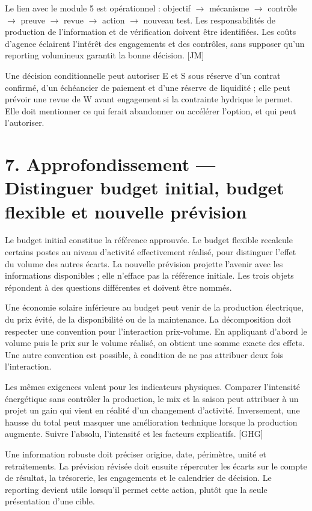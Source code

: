 \documentclass[12pt,a4paper]{article}
\begin{document}
Le lien avec le module 5 est opérationnel : objectif $\rightarrow$ mécanisme $\rightarrow$ contrôle $\rightarrow$ preuve $\rightarrow$ revue $\rightarrow$ action $\rightarrow$ nouveau test. Les responsabilités de production de l’information et de vérification doivent être identifiées. Les coûts d’agence éclairent l’intérêt des engagements et des contrôles, sans supposer qu’un reporting volumineux garantit la bonne décision. [JM]


Une décision conditionnelle peut autoriser E et S sous réserve d’un contrat confirmé, d’un échéancier de paiement et d’une réserve de liquidité ; elle peut prévoir une revue de W avant engagement si la contrainte hydrique le permet. Elle doit mentionner ce qui ferait abandonner ou accélérer l’option, et qui peut l’autoriser.

\section*{7. Approfondissement --- Distinguer budget initial, budget flexible et nouvelle prévision}
Le budget initial constitue la référence approuvée. Le budget flexible recalcule certains postes au niveau d’activité effectivement réalisé, pour distinguer l’effet du volume des autres écarts. La nouvelle prévision projette l’avenir avec les informations disponibles ; elle n’efface pas la référence initiale. Les trois objets répondent à des questions différentes et doivent être nommés.


Une économie solaire inférieure au budget peut venir de la production électrique, du prix évité, de la disponibilité ou de la maintenance. La décomposition doit respecter une convention pour l’interaction prix-volume. En appliquant d’abord le volume puis le prix sur le volume réalisé, on obtient une somme exacte des effets. Une autre convention est possible, à condition de ne pas attribuer deux fois l’interaction.


Les mêmes exigences valent pour les indicateurs physiques. Comparer l’intensité énergétique sans contrôler la production, le mix et la saison peut attribuer à un projet un gain qui vient en réalité d’un changement d’activité. Inversement, une hausse du total peut masquer une amélioration technique lorsque la production augmente. Suivre l’absolu, l’intensité et les facteurs explicatifs. [GHG]


Une information robuste doit préciser origine, date, périmètre, unité et retraitements. La prévision révisée doit ensuite répercuter les écarts sur le compte de résultat, la trésorerie, les engagements et le calendrier de décision. Le reporting devient utile lorsqu’il permet cette action, plutôt que la seule présentation d’une cible.
\end{document}
